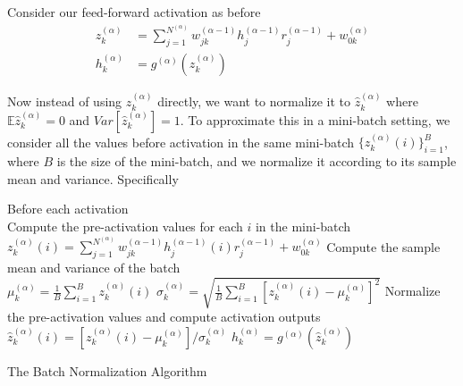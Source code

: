 Consider our feed-forward activation as before
%
\begin{equation*}
\begin{aligned}
  z^{(\alpha)}_k &= \sum_{j=1}^{N^{(\alpha)}} w_{jk}^{(\alpha-1)} 
    h_j^{(\alpha-1)} r_j^{(\alpha-1)}
     + w^{(\alpha)}_{0k} \\
   h^{(\alpha)}_k &= g^{(\alpha)}
    \left(z^{(\alpha)}_k \right)
\end{aligned}
\end{equation*}

Now instead of using $z^{(\alpha)}_k$ directly,
we want to normalize it to $\hat{z}^{(\alpha)}_k$
where $\mathbb{E}\hat{z}^{(\alpha)}_k = 0$
and $Var[\hat{z}^{(\alpha)}_k] = 1$. 
To approximate this in a mini-batch setting,
we consider all the values before activation 
in the same mini-batch
$\{z^{(\alpha)}_k(i)\}_{i=1}^B$,
where $B$ is the size of the mini-batch,
and we normalize it according to its sample 
mean and variance. Specifically

\begin{algorithm}[H]
 Before each activation \\
 Compute the pre-activation values
 for each $i$ in the mini-batch \\
 $z^{(\alpha)}_k(i) = \sum_{j=1}^{N^{(\alpha)}} w_{jk}^{(\alpha-1)} 
    h_j^{(\alpha-1)}(i) r_j^{(\alpha-1)}
     + w^{(\alpha)}_{0k}$ \;
 Compute the sample mean and variance of the batch \\
 $\mu^{(\alpha)}_k = \frac{1}{B} \sum_{i=1}^B z^{(\alpha)}_k(i)$\;
 $\sigma^{(\alpha)}_k = \sqrt{\frac{1}{B}
  \sum_{i=1}^B \left[z^{(\alpha)}_k(i) - 
                    \mu^{(\alpha)}_k\right]^2}$ \;
 Normalize the pre-activation values
 and compute activation outputs \\
 $\hat{z}^{(\alpha)}_k(i) = 
  \left[z^{(\alpha)}_k(i) - \mu^{(\alpha)}_k\right] /
  \sigma^{(\alpha)}_k $ \;
 $h^{(\alpha)}_k = g^{(\alpha)}
    \left(\hat{z}^{(\alpha)}_k \right)$
 
 \caption{The Batch Normalization Algorithm}
\end{algorithm}




















